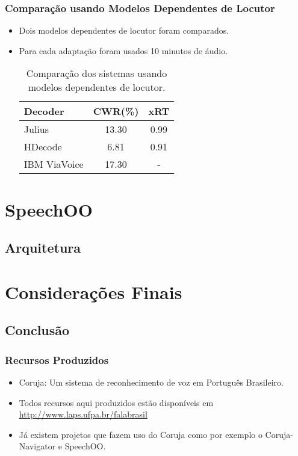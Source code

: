 \documentclass{beamer}
\begin{document}
\begin{frame}
   \frametitle{Comparação usando Modelos Dependentes de Locutor}
   \begin{itemize}
      \item Dois modelos dependentes de locutor foram comparados.
      \item Para cada adaptação foram usados 10 minutos de áudio.
      \begin{center}
      \begin{table}
	 \begin{tabular}{ l c c }
	    \toprule
	    \textbf{Decoder} & \textbf{CWR(\%)} & \textbf{xRT} \\\midrule
	    Julius & 13.30 & 0.99 \\\midrule
	    HDecode & 6.81 & 0.91 \\\midrule
	    IBM ViaVoice & 17.30 & - \\
	    \bottomrule
	 \end{tabular}
	 \caption{Comparação dos sistemas usando modelos dependentes de locutor.}
      \end{table}
      \end{center}
   \end{itemize}
\end{frame}

\section{SpeechOO}
\subsection{Arquitetura}

\section{Considerações Finais}
\subsection{Conclusão}
\begin{frame}
   \frametitle{Recursos Produzidos}
   \begin{itemize}
      \item Coruja: Um sistema de reconhecimento de voz em Português
	 Brasileiro.
      \item Todos recursos aqui produzidos estão disponíveis
	 em \url{http://www.laps.ufpa.br/falabrasil}
      \item Já existem projetos que fazem uso do Coruja como por
	 exemplo o Coruja-Navigator e SpeechOO.
   \end{itemize}
\end{frame}
\end{document}
